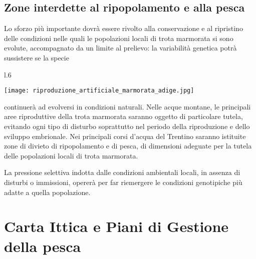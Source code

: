 \documentclass[10pt,twoside,openany,x11names,svgnames,italian,a5paper,dvipsnames,table]{memoir}
\begin{document}
\subsection{Zone interdette al ripopolamento e alla pesca}
Lo sforzo più importante dovrà essere rivolto alla conservazione e al ripristino delle condizioni nelle quali le popolazioni locali di trota marmorata si sono evolute, accompagnato da un limite al prelievo: la variabilità genetica potrà sussistere se la specie \begin{wrapfigure}[15]{l}{.6\textwidth}
\begin{center}
\texttt{[image: riproduzione\_artificiale\_marmorata\_adige.jpg]}
\caption*{Riproduzione artificiale di trota marmorata\newline nell'Adige.}
\end{center}
\end{wrapfigure}continuerà ad evolversi in condizioni naturali. Nelle acque montane, le principali aree riproduttive della trota marmorata saranno oggetto di particolare tutela, evitando ogni tipo di disturbo soprattutto nel periodo della riproduzione e dello sviluppo embrionale. Nei principali corsi d’acqua del Trentino saranno istituite zone di divieto di ripopolamento e di pesca, di dimensioni adeguate per la tutela delle popolazioni locali di trota marmorata.


La pressione selettiva indotta dalle condizioni ambientali locali, in assenza di disturbi o immissioni, opererà per far riemergere le condizioni genotipiche più adatte a quella popolazione.

\section{Carta Ittica e Piani di Gestione della pesca}
\end{document}
